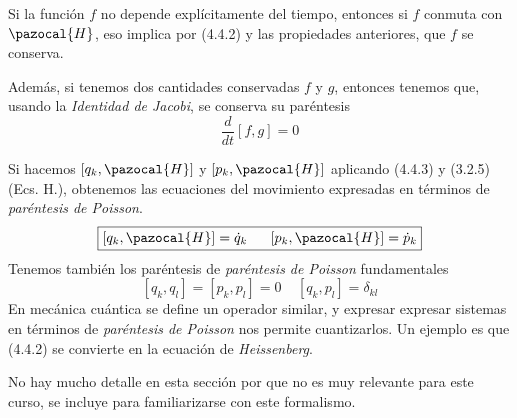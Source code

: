 Si la función $f$ no depende explícitamente del tiempo, entonces si $f$ conmuta con $\pazocal{H}$, eso implica por (4.4.2) y las propiedades anteriores, que $f$ se conserva.

Además, si tenemos dos cantidades conservadas $f$ y $g$, entonces tenemos que, usando la \textit{Identidad de Jacobi}, se conserva su paréntesis
\begin{equation} \label{4.4.5}
    \frac{d}{dt}[f,g]=0
\end{equation}

Si hacemos $[q_k,\pazocal{H}]$ y $[p_k,\pazocal{H}]$ aplicando (4.4.3) y (3.2.5) (Ecs. H.), obtenemos las ecuaciones del movimiento expresadas en términos de \textit{paréntesis de Poisson}.
\begin{equation} \label{4.4.6}
    \boxed{[q_k,\pazocal{H}] = \dot{q}_k \ \ \ \ \ [p_k,\pazocal{H}]=\dot{p}_k}
\end{equation}
Tenemos también los paréntesis de \textit{paréntesis de Poisson} fundamentales
\begin{equation} \label{4.4.7}
    [q_k,q_l]=[p_k,p_l]=0 \ \ \ \ \ [q_k,p_l]=\delta_{kl}
\end{equation}
En mecánica cuántica se define un operador similar, y expresar expresar sistemas en términos de \textit{paréntesis de Poisson} nos permite cuantizarlos. Un ejemplo es que (4.4.2) se convierte en la ecuación de \textit{Heissenberg}.

No hay mucho detalle en esta sección por que no es muy relevante para este curso, se incluye para familiarizarse con este formalismo.
